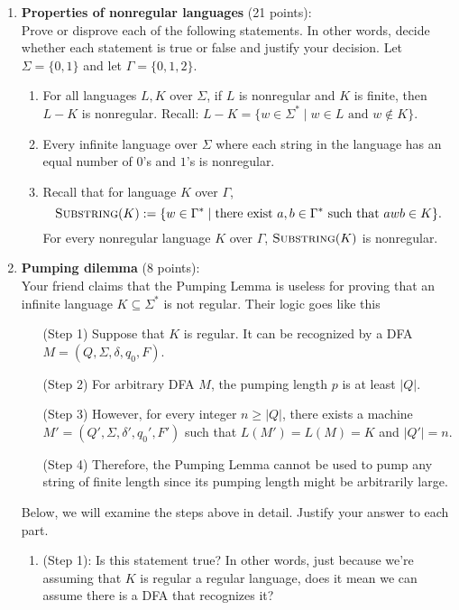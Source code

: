 \begin{enumerate}
\item \textbf{Properties of nonregular languages} (21 points): \\
Prove or disprove each of the following statements. In other words, decide whether 
each statement is true or false and justify your decision. 
Let $\Sigma = \{0,1\}$ and let $\Gamma = \{0,1,2\}$.
\begin{enumerate}
    \item\gradeCorrect For all languages $L, K$ over
    $\Sigma$, if $L$ is nonregular and $K$ is finite, then $L - K$ is nonregular.
    Recall: $L - K = \{ w \in \Sigma^* \mid w \in L \text{ and } w \notin K\}$.
    \item\gradeCorrect Every infinite language over $\Sigma$ 
    where each string in the language has an equal number of $0$'s and 
    $1$'s is nonregular.
    \item\gradeCorrect Recall that for language $K$ over $\Gamma$,
    \[
    \textsc{Substring}(K) := \{ w \in \Gamma^* \mid \text{there exist } a,b \in \Gamma^* \text{ such that } awb \in K\}.
    \]
    For every nonregular language $K$ over $\Gamma$, $\textsc{Substring}(K)$ is nonregular.
\end{enumerate}

\item \textbf{Pumping dilemma} (8 points): \\
Your friend claims that the Pumping Lemma is useless for proving that an infinite language 
$K \subseteq \Sigma^*$ is not regular. Their logic goes like this

\begin{enumerate}[label=(Step~\arabic*), leftmargin=2cm]
\item[(Step 1)] Suppose that $K$ is regular. It can be recognized by a 
DFA $M = (Q, \Sigma, \delta, q_0, F)$.
\item[(Step 2)] For arbitrary DFA $M$, the pumping length $p$ is at least $|Q|$.
\item[(Step 3)] However, for every integer $n \ge |Q|$, there exists a machine 
$M' = (Q', \Sigma, \delta', q_0', F')$ such that $L(M') = L(M) = K$ and $|Q'| = n$.
\item[(Step 4)] Therefore, the Pumping Lemma cannot be used to pump any string 
of finite length since its pumping length might be arbitrarily large.
\end{enumerate}

Below, we will examine the steps above in detail. Justify your answer to each part.
\begin{enumerate}
    \item\gradeCompleteFirst (Step 1): Is this statement true? In other words, just because we're assuming that $K$ is regular a regular language, does it mean we can assume there is a DFA that recognizes it?


\end{enumerate}
\end{enumerate}

